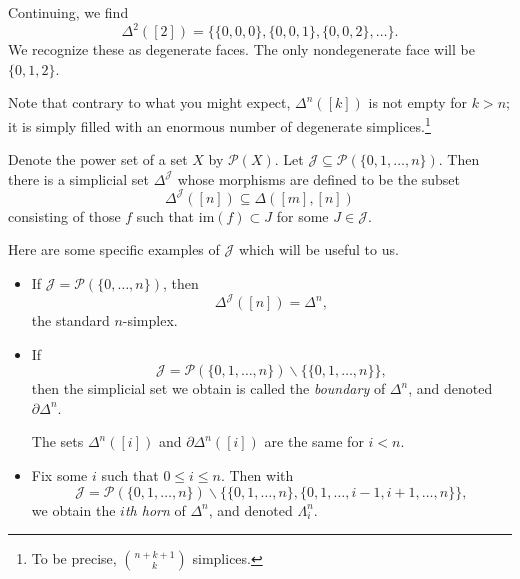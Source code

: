\documentclass[main.tex]{subfiles}
\begin{document}
Continuing, we find
\begin{equation*}
  \Delta^{2}([2]) = \{\{0,0,0\}, \{0,0,1\}, \{0,0,2\}, \ldots\}.
\end{equation*}
We recognize these as degenerate faces. The only nondegenerate face will be $\{0,1,2\}$.

Note that contrary to what you might expect, $\Delta^{n}([k])$ is not empty for $k > n$; it is simply filled with an enormous number of degenerate simplices.\footnote{To be precise, $\binom{n+k+1}{k}$ simplices.}

\begin{example}
  Denote the power set of a set $X$ by $\mathcal{P}(X)$. Let $\mathcal{J} \subseteq \mathcal{P}(\{0, 1, \ldots, n\})$. Then there is a simplicial set $\Delta^{\mathcal{J}}$ whose morphisms are defined to be the subset
  \begin{equation*}
    \Delta^{\mathcal{J}}([n]) \subseteq \Delta([m], [n])
  \end{equation*}
  consisting of those $f$ such that $\mathrm{im}(f) \subset J$ for some $J \in \mathcal{J}$.

  Here are some specific examples of $\mathcal{J}$ which will be useful to us. \begin{itemize}
    \item If $\mathcal{J} = \mathcal{P}(\{0, \ldots, n\})$, then
      \begin{equation*}
        \Delta^{\mathcal{J}}([n]) = \Delta^{n},
      \end{equation*}
      the standard $n$-simplex.

    \item If
      \begin{equation*}
        \mathcal{J} = \mathcal{P}(\{0, 1, \ldots, n\}) \smallsetminus \{\{0, 1, \ldots, n\}\},
      \end{equation*}
      then the simplicial set we obtain is called the \emph{boundary} of $\Delta^{n}$, and denoted $\partial \Delta^{n}$.

      The sets $\Delta^{n}([i])$ and $\partial \Delta^{n}([i])$ are the same for $i < n$.

    \item Fix some $i$ such that $0 \leq i \leq n$. Then with
      \begin{equation*}
        \mathcal{J} = \mathcal{P}(\{0, 1, \ldots, n\}) \smallsetminus \{\{0, 1, \ldots, n\}, \{0, 1, \ldots, i - 1, i + 1, \ldots, n\}\},
      \end{equation*}
      we obtain the \emph{$i$th horn} of $\Delta^{n}$, and denoted $\Lambda^{n}_{i}$.


\end{itemize}
\end{example}
\end{document}
